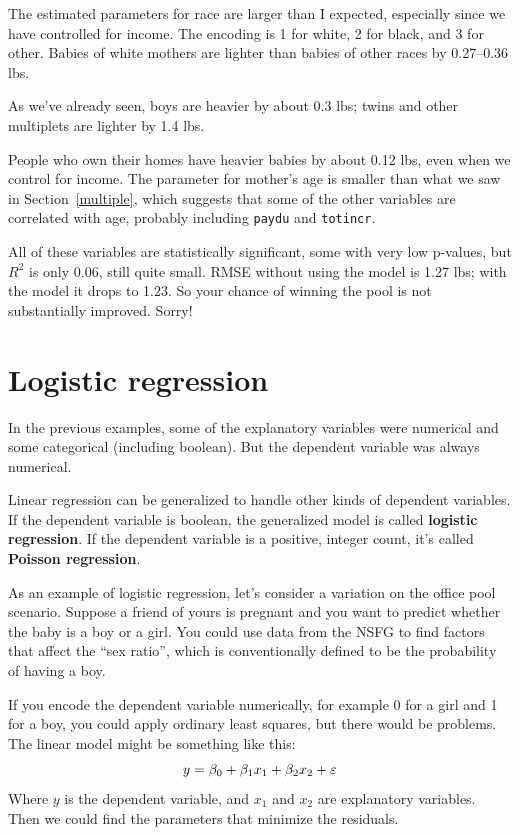 \documentclass[12pt]{book}
\begin{document}
The estimated parameters for race are larger than I expected,
especially since we have controlled for income.  The encoding
is 1 for white, 2 for black, and 3 for other.  Babies of white
mothers are lighter than babies of other races by 0.27--0.36 lbs.

As we've already seen, boys are heavier by about 0.3 lbs;
twins and other multiplets are lighter by 1.4 lbs.

People who own their homes have heavier babies by about 0.12 lbs,
even when we control for income.  The parameter for mother's
age is smaller than what we saw in Section~\ref{multiple}, which
suggests that some of the other variables are correlated with
age, probably including {\tt paydu} and {\tt totincr}.

All of these variables are statistically significant, some with
very low p-values, but 
$R^2$ is only 0.06, still quite small.
RMSE without using the model is 1.27 lbs; with the model it drops
to 1.23.  So your chance of winning the pool is not substantially
improved.  Sorry!



\section{Logistic regression}

In the previous examples, some of the explanatory variables were
numerical and some categorical (including boolean).  But the dependent
variable was always numerical.

Linear regression can be generalized to handle other kinds of
dependent variables.  If the dependent variable is boolean, the
generalized model is called {\bf logistic regression}.  If the dependent
variable is a positive, integer count, it's called {\bf Poisson
regression}.

As an example of logistic regression, let's consider a variation
on the office pool scenario.
Suppose
a friend of yours is pregnant and you want to predict whether the
baby is a boy or a girl.  You could use data from the NSFG to find
factors that affect the ``sex ratio'', which is conventionally
defined to be the probability
of having a boy.

If you encode the dependent variable numerically, for example 0 for a
girl and 1 for a boy, you could apply ordinary least squares, but
there would be problems.  The linear model might be something like
this:
%
\[ y = \beta_0 + \beta_1 x_1 + \beta_2 x_2 + \varepsilon \]
%
Where $y$ is the dependent variable, and $x_1$ and $x_2$ are
explanatory variables.  Then we could find the parameters that
minimize the residuals.
\end{document}
